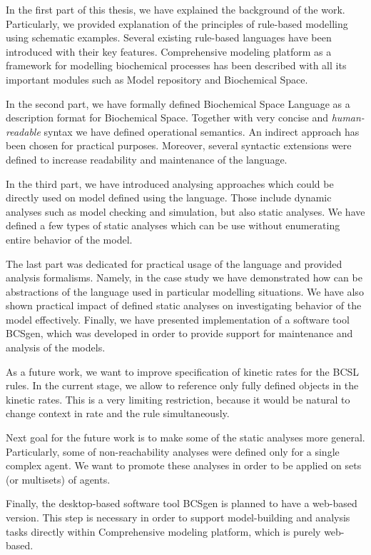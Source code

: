 \documentclass[12pt]{fithesis2}
\begin{document}
In the first part of this thesis, we have explained the background of the work. Particularly, we provided explanation of the principles of rule-based modelling using schematic examples. Several existing rule-based languages have been introduced with their key features. Comprehensive modeling platform as a framework for modelling biochemical processes has been described with all its important modules such as Model repository and Biochemical Space.

In the second part, we have formally defined Biochemical Space Language as a description format for Biochemical Space. Together with very concise and \emph{human-readable} syntax we have defined operational semantics. An indirect approach has been chosen for practical purposes. Moreover, several syntactic extensions were defined to increase readability and maintenance of the language.

In the third part, we have introduced analysing approaches which could be directly used on model defined using the language. Those include dynamic analyses such as model checking and simulation, but also static analyses. We have defined a few types of static analyses which can be use without enumerating entire behavior of the model.

The last part was dedicated for practical usage of the language and provided analysis formalisms. Namely, in the case study we have demonstrated how can be abstractions of the language used in particular modelling situations. We have also shown practical impact of defined static analyses on investigating behavior of the model effectively. Finally, we have presented implementation of a software tool BCSgen, which was developed in order to provide support for maintenance and analysis of the models.

As a future work, we want to improve specification of kinetic rates for the BCSL rules. In the current stage, we allow to reference only fully defined objects in the kinetic rates. This is a very limiting restriction, because it would be natural to change context in rate and the rule simultaneously.

Next goal for the future work is to make some of the static analyses more general. Particularly, some of non-reachability analyses were defined only for a single complex agent. We want to promote these analyses in order to be applied on sets (or multisets) of agents.

Finally, the desktop-based software tool BCSgen is planned to have a web-based version. This step is necessary in order to support model-building and analysis tasks directly within Comprehensive modeling platform, which is purely web-based.
\end{document}
